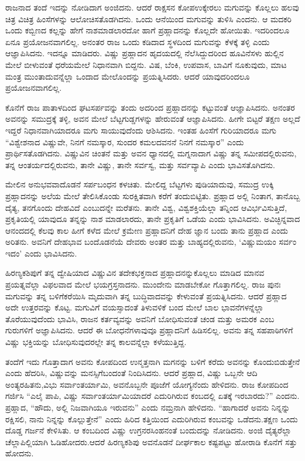 \vskip 0.3cm

ರಾಜನಾದ ತಂದೆ ಇದನ್ನು ನೋಡಿದಾಗ ಅಂಜಿದನು. ಆದರೆ ರಾಕ್ಷಸನ ಕೋಪ\break ಉಕ್ಕೇರಲು ಮಗುವನ್ನು ಕೊಲ್ಲಲು ಹಲವು ಚಿತ್ರ ವಿಚಿತ್ರ ಹಿಂಸೆಗಳನ್ನು ಆಲೋಚಿಸತೊಡಗಿದನು. ಒಂದು ಆನೆಯಿಂದ ಮಗುವನ್ನು ತುಳಿಸಿ ಎಂದನು. ಆ ಮದಕರಿ ಒಂದು ಕಬ್ಬಿಣದ ಕಲ್ಲನ್ನು ಹೇಗೆ ನಾಶಮಾಡಲಾರದೋ ಹಾಗೆ ಪ್ರಹ್ಲಾದನನ್ನು ಕೊಲ್ಲದೇ ಹೋಯಿತು. ಇದರಿಂದಲೂ ಏನೂ ಪ್ರಯೋಜನವಾಗಲಿಲ್ಲ. ಅನಂತರ ರಾಜ ಒಂದು ಕಡಿದಾದ ಸ್ಥಳದಿಂದ ಮಗುವನ್ನು ಕೆಳಕ್ಕೆ ತಳ್ಳಿ ಎಂದು ಆಜ್ಞಾಪಿಸಿದನು. ಇದನ್ನೂ ಮಾಡಿದರು. ವಿಷ್ಣು ಪ್ರಹ್ಲಾದನ ಹೃದಯದಲ್ಲಿ ನೆಲೆಸಿದ್ದುದರಿಂದ ಹೂವಿನೆಸಳು ಹುಲ್ಲಿನ ಮೇಲೆ ಬೀಳುವಂತೆ ಧರೆಯಮೇಲೆ ನಿಧಾನವಾಗಿ ಬಿದ್ದನು. ವಿಷ, ಬೆಂಕಿ, ಉಪವಾಸ, ಬಾವಿಗೆ ನೂಕುವುದು, ಮಾಟ ಮಂತ್ರ ಮುಂತಾದುವನ್ನೆಲ್ಲಾ ಒಂದಾದ ಮೇಲೊಂದನ್ನು ಪ್ರಯತ್ನಿಸಿದರು. ಆದರೆ ಯಾವುದ\-ರಿಂದಲೂ ಪ್ರಯೋಜನವಾಗಲಿಲ್ಲ.

\vskip 0.3cm

ಕೊನೆಗೆ ರಾಜ ಪಾತಾಳದಿಂದ ಘಟಸರ್ಪವನ್ನು ತಂದು ಅದರಿಂದ ಪ್ರಹ್ಲಾದನನ್ನು ಕಟ್ಟುವಂತೆ ಆಜ್ಞಾಪಿಸಿದನು. ಅನಂತರ ಅವನನ್ನು ಸಮುದ್ರಕ್ಕೆ ತಳ್ಳಿ, ಅವನ ಮೇಲೆ ಬೆಟ್ಟಗುಡ್ಡಗಳನ್ನು ಹೇರುವಂತೆ ಆಜ್ಞಾಪಿಸಿದನು. ಹೀಗೇ ಬಿಟ್ಟರೆ ತಕ್ಷಣ ಅಲ್ಲದೆ ಇದ್ದರೆ ನಿಧಾನವಾಗಿಯಾದರೂ ಮಗು ಸಾಯುವುದೆಂದು ಆಶಿಸಿದನು. ಇಂತಹ ಹಿಂಸೆಗೆ ಗುರಿಯಾದರೂ ಮಗು “ವಿಶ್ವೇಶನಾದ ವಿಷ್ಣುವೇ, ನಿನಗೆ ನಮಸ್ಕಾರ, ಸುಂದರ ಕಮಲದವನನೆ ನಿನಗೆ ನಮಸ್ಕಾರ” ಎಂದು ಪ್ರಾರ್ಥಿಸತೊಡಗಿದನು. ವಿಷ್ಣುವಿನ ಚಿಂತನೆ ಮತ್ತು ಅವನ ಧ್ಯಾನದಲ್ಲಿ ಮಗ್ನನಾದಾಗ ವಿಷ್ಣು ತನ್ನ ಸಮೀಪದಲ್ಲಿರುವನು, ತನ್ನ ಆಂತರ್ಯದಲ್ಲಿರುವನು, ತಾನೇ ವಿಷ್ಣು, ತಾನೇ ಸರ್ವಸ್ವ, ಮತ್ತು ಸರ್ವವ್ಯಾಪಿ ಎಂದು ಭಾವಿಸತೊಗಿದನು.

ಮೇಲಿನ ಅನುಭವವಾದೊಡನೆ ಸರ್ಪಬಂಧನ ಕಳಚಿತು. ಮೇಲಿದ್ದ ಬೆಟ್ಟಗಳು ಪುಡಿ\-ಯಾದುವು, ಸಮುದ್ರ ಉಕ್ಕಿ ಪ್ರಹ್ಲಾದನನ್ನು ಅಲೆಯ ಮೇಲೆ ತೇಲಿಸಿಕೊಂಡು ಸುರಕ್ಷಿತವಾಗಿ ಕರೆಗೆ ತಂದುಬಿಟ್ಟಿತು. ಪ್ರಹ್ಲಾದ ಅಲ್ಲಿ ನಿಂತಾಗ, ತಾನೊಬ್ಬ ದೈತ್ಯ, ತನಗೊಂದು ದೇಹವಿದೆ ಎಂಬುದನ್ನೇ ಮರೆತನು. ತಾನೇ ವಿಶ್ವ, ವಿಶ್ವಶಕ್ತಿಯೆಲ್ಲಾ ತನ್ನಿಂದ ಆವಿರ್ಭವಿಸುತ್ತಿದೆ, ಪ್ರಕೃತಿಯಲ್ಲಿ ಯಾವುದೂ ತನ್ನನ್ನು ನಾಶ ಮಾಡಲಾರದು, ತಾನೇ ಪ್ರಕೃತಿಗೆ ಒಡೆಯ ಎಂದು ಭಾವಿಸಿದನು. ಅವಿಚ್ಛಿನ್ನವಾದ ಆನಂದದಲ್ಲಿ ಕೆಲವು ಕಾಲ ಹೀಗೆ ಕಳೆದ ಮೇಲೆ ಕ್ರಮೇಣ ಪ್ರಹ್ಲಾದನಿಗೆ ದೇಹ ಜ್ಞಾನ ಬಂದು ತಾನು ಪ್ರಹ್ಲಾದ ಎಂದು ಅರಿತನು. ಅವನಿಗೆ ದೇಹಭಾವ ಬಂದೊಡನೆಯೆ ದೇವರು ಅಂತರ ಮತ್ತು ಬಾಹ್ಯದಲ್ಲಿರುವನು, ‘ವಿಷ್ಣುಮಯಂ ಸರ್ವಂ ಇದಂ’ ಎಂದು ಭಾವಿಸಿದನು.

ಹಿರಣ್ಯಕಶಿಪುಗೆ ತನ್ನ ದ್ವೇಷಿಯಾದ ವಿಷ್ಣುವಿನ ತದೇಕಭಕ್ತನಾದ ಪ್ರಹ್ಲಾದನನ್ನು\break ಕೊಲ್ಲಲು ಮಾಡಿದ ಮಾನವ ಪ್ರಯತ್ನವೆಲ್ಲಾ ವಿಫಲವಾದ ಮೇಲೆ ಭಯಗ್ರಸ್ತನಾದನು. ಮುಂದೇನು ಮಾಡಬೇಕೋ ಗೊತ್ತಾಗಲಿಲ್ಲ. ರಾಜ ಪುನಃ ಮಗುವನ್ನು ತನ್ನ ಬಳಿಗೆ\break ಕರೆಯಿಸಿ ಮೃದುವಾಗಿ ತನ್ನ ಬುದ್ಧಿವಾದವನ್ನು ಕೇಳುವಂತೆ ಪ್ರಯತ್ನಿಸಿದನು. ಆದರೆ ಪ್ರಹ್ಲಾದ ಅದೇ ಉತ್ತರವನ್ನು ಕೊಟ್ಟ. ಮಗುವಿಗೆ ವಯಸ್ಸಾದಂತೆ ತಿಳುವಳಿಕೆ ಬಂದ ಮೇಲೆ ಬಾಲ ಭಾವನೆಗಳನ್ನೆಲ್ಲಾ ತೊರೆಯುವುದೆಂದು ಭಾವಿಸಿ, ರಾಜನ ಕರ್ತವ್ಯವನ್ನು ಅವನಿಗೆ ಬೋಧಿಸುವಂತೆ ಚಂಡ ಮತ್ತು ಅಮರಕ ಎಂಬ ಗುರುಗಳಿಗೆ ಅಜ್ಞಾಪಿಸಿದನು. ಆದರೆ ಈ ಬೋಧನೆಗಳಾವುವೂ ಪ್ರಹ್ಲಾದನಿಗೆ ಹಿಡಿಸಲಿಲ್ಲ. ಅವನು ತನ್ನ ಸಹಪಾಠಿಗಳಿಗೆ ವಿಷ್ಣು ಭಕ್ತಿಯನ್ನು ಬೋಧಿಸುವುದರಲ್ಲೇ ತನ್ನ ಕಾಲವನ್ನೆಲ್ಲಾ ಕಳೆಯುತ್ತಿದ್ದ.

ತಂದೆಗೆ ಇದು ಗೊತ್ತಾದಾಗ ಅವನು ಕೋಪದಿಂದ ಉನ್ಮತ್ತನಾಗಿ ಮಗನನ್ನು ಬಳಿಗೆ ಕರೆದು ಅವನನ್ನು ಕೊಂದುಬಿಡುತ್ತೇನೆ ಎಂದು ಹೆದರಿಸಿ, ವಿಷ್ಣುವನ್ನು ಮನಸ್ಸಿಗೆ\break ಬಂದಂತೆ ನಿಂದಿಸಿದನು. ಆದರೆ ಪ್ರಹ್ಲಾದ, ವಿಷ್ಣು ಒಬ್ಬನೇ ಆದಿ ಅಂತ್ಯರಹಿತನು,\break ವಿಭು ಸರ್ವಾಂತರ್ಯಾಮಿ, ಅವನೊಬ್ಬನೇ ಪೂಜೆಗೆ ಯೋಗ್ಯನೆಂದು ಹೇಳಿದನು. ರಾಜ ಕೋಪದಿಂದ ಗರ್ಜಿಸಿ “ಎಲೈ ಪಾಪಿ, ವಿಷ್ಣು ಸರ್ವಾಂತರ್ಯಾಮಿಯಾದರೆ ಎದುರಿಗಿರುವ ಕಂಬದಲ್ಲಿ ಏತಕ್ಕೆ ಇರಬಾರದು?” ಎಂದನು. ಪ್ರಹ್ಲಾದ, “ಹೌದು, ಅಲ್ಲಿ ನಿಜವಾಗಿಯೂ ಇರುವನು” ಎಂದು ನಮ್ರನಾಗಿ ಹೇಳಿದನು. “ಹಾಗಾದರೆ ಅವನು ನಿನ್ನನ್ನು ರಕ್ಷಿಸಲಿ, ನಾನು ನಿನ್ನನ್ನು ಕೊಲ್ಲುತ್ತೇನೆ” ಎಂದು ಹಿರಿದ ಕತ್ತಿಯಿಂದ ಎದುರಿಗಿರುವ ಕಂಬವನ್ನು ಒಡೆದನು.\break ತಕ್ಷಣ ಒಂದು ದೊಡ್ಡ ಗರ್ಜನೆ ಕೇಳಿಸಿತು. ಆ ಕಂಬದಿಂದ ವಿಷ್ಣು ಉಗ್ರನರಸಿಂಹನಂತೆ ಬಂದುದನ್ನು ನೋಡಿದನು. ಅಂಜಿ ದೈತ್ಯರೆಲ್ಲಾ ಚೆಲ್ಲಾಪಿಲ್ಲಿಯಾಗಿ ಓಡಿಹೋದರು.\break ಆದರೆ ಹಿರಣ್ಯಕಶಿಪು ಅವನೊಡನೆ ದೀರ್ಘಕಾಲ ಕಷ್ಟಪಟ್ಟು ಹೋರಾಡಿ ಕೊನೆಗೆ ಸತ್ತು ಹೋದನು.

